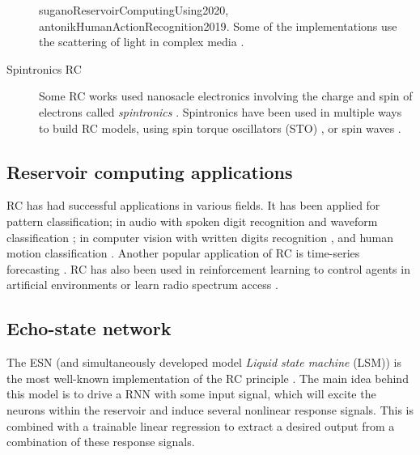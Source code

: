 \begin{description}
{        suganoReservoirComputingUsing2020, antonikHumanActionRecognition2019}.
        Some of the implementations use the scattering of light in complex media
        \parencite{dongOpticalReservoirComputing2020,
        rafayelyanLargeScaleOpticalReservoir2020}.
  \item[Spintronics \ac{RC}] Some \ac{RC} works used nanosacle electronics
        involving the charge and spin of electrons called \emph{spintronics}
        \parencite{wolfSpintronicsSpinBasedElectronics2001}. Spintronics have
        been used in multiple ways to build \ac{RC} models, using spin torque
        oscillators (STO)
        \parencite{torrejonNeuromorphicComputingNanoscale2017,
        williameChaoticDynamicsMacrospin2019}, or spin waves
        \parencite{nakaneReservoirComputingSpin2018}.
\end{description}

\subsection{Reservoir computing applications}

\ac{RC} has had successful applications in various fields. It has been applied
for pattern classification; in audio with spoken digit recognition
\parencite{verstraetenIsolatedWordRecognition2005} and waveform classification
\parencite{paquotOptoelectronicReservoirComputing2012}; in computer vision with
written digits recognition \parencite{jalalvandRealTimeReservoirComputing2015},
and human motion classification \parencite{sohIterativeTemporalLearning2012,
  antonikHumanActionRecognition2019}. Another popular application of \ac{RC} is
time-series forecasting \parencite{jaegerEchoStateApproach2001,
  jaegerAdaptiveNonlinearSystem2002, wyffelsComparativeStudyReservoir2010}.
\ac{RC} has also been used in reinforcement learning to control agents in
artificial environments \parencite{kannoPhotonicReinforcementLearning2022} or
learn radio spectrum access \parencite{changDistributiveDynamicSpectrum2019}.

\subsection{Echo-state network}

The \acf{ESN} (and simultaneously developed model \emph{Liquid state machine}
(LSM)) is the most well-known implementation of the \ac{RC} principle
\parencite{tanakaRecentAdvancesPhysical2019}. The main idea behind this model is
to drive a \ac{RNN} with some input signal, which will excite the neurons within
the reservoir and induce several nonlinear response signals. This is combined
with a trainable linear regression to extract a desired output from a
combination of these response signals.

